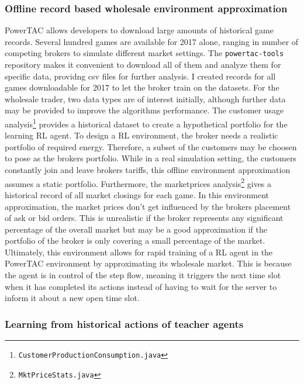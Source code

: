 \subsubsection{Offline record based wholesale environment approximation}%
\label{ssub:offline_record_based_wholesale_environment_approximation}

\ac{PowerTAC} allows developers to download large amounts of historical game records. Several hundred games are
available for 2017 alone, ranging in number of competing brokers to simulate different market settings. The
\texttt{powertac-tools} repository makes it convenient to download all  of them and analyze them for specific data,
providng csv files for further analysis. I created records for all games downloadable for 2017 to let the broker train on
the datasets. For the wholesale trader, two data types are of interest initially, although further data may be provided
to improve the algorithms performance. The customer usage analysis\footnote{\texttt{CustomerProductionConsumption.java}}
provides a historical dataset to create a
hypothetical portfolio for the learning \ac{RL} agent. To design a \ac{RL} environment, the broker needs a realistic
portfolio of required energy. Therefore, a subset of the customers may be choosen to pose as the brokers portfolio.
While in a real simulation setting, the customers constantly join and leave brokers tariffs, this offline environment
approximation assumes a static portfolio. Furthermore, the marketprices analysis\footnote{\texttt{MktPriceStats.java}} gives a historical record of all market closings for each game. In this
environment approximation, the market prices don't get influenced by the brokers placement of ask or bid orders. This is
unrealistic if the broker represents any significant percentage of the overall market but may be a good approximation if
the portfolio of the broker is only covering a small percentage of the market. Ultimately, this environment allows for
rapid training of a \ac{RL} agent in the \ac{PowerTAC} environment by approximating its wholesale market. This is
because the agent is in control of the step flow, meaning it triggers the next time slot when it has completed its
actions instead of having to wait for the server to inform it about a new open time slot.

\subsubsection{Learning from historical actions of teacher agents}%
\label{ssub:learning_from_historical_actions_of_teacher_agents}

